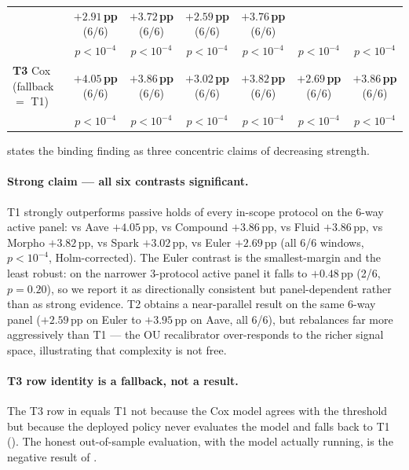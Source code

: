 \begin{table}[t]
\begin{tabular}{lcccccc}
      & \textbf{$+2.91$\,pp} (6/6)
      & \textbf{$+3.72$\,pp} (6/6)
      & \textbf{$+2.59$\,pp} (6/6)
      & \textbf{$+3.76$\,pp} (6/6) \\
      & $p < 10^{-4}$
      & $p < 10^{-4}$
      & $p < 10^{-4}$
      & $p < 10^{-4}$
      & $p < 10^{-4}$
      & $p < 10^{-4}$ \\
    \midrule
    \textbf{T3} Cox (fallback $=$ T1)
      & \textbf{$+4.05$\,pp} (6/6)
      & \textbf{$+3.86$\,pp} (6/6)
      & \textbf{$+3.02$\,pp} (6/6)
      & \textbf{$+3.82$\,pp} (6/6)
      & \textbf{$+2.69$\,pp} (6/6)
      & \textbf{$+3.86$\,pp} (6/6) \\
      & $p < 10^{-4}$
      & $p < 10^{-4}$
      & $p < 10^{-4}$
      & $p < 10^{-4}$
      & $p < 10^{-4}$
      & $p < 10^{-4}$ \\
    \bottomrule
  \end{tabular}
\end{table}

 states the binding finding as three concentric
claims of decreasing strength.

\paragraph{Strong claim — all six contrasts significant.} T1
strongly outperforms passive holds of every in-scope protocol on
the 6-way active panel: vs Aave $+4.05$\,pp, vs Compound
$+3.86$\,pp, vs Fluid $+3.86$\,pp, vs Morpho $+3.82$\,pp, vs Spark
$+3.02$\,pp, vs Euler $+2.69$\,pp (all 6/6 windows, $p < 10^{-4}$,
Holm-corrected). The Euler contrast is the smallest-margin and the
least robust: on the narrower 3-protocol active panel it falls to
$+0.48$\,pp (2/6, $p = 0.20$), so we report it as directionally
consistent but panel-dependent rather than as strong evidence. T2
obtains a near-parallel result on the same 6-way panel ($+2.59$\,pp
on Euler to $+3.95$\,pp on Aave, all 6/6), but rebalances far more
aggressively than T1 --- the OU recalibrator over-responds to the
richer signal space, illustrating that complexity is not free.

\paragraph{T3 row identity is a fallback, not a result.}
The T3 row in  equals T1 not because the Cox
model agrees with the threshold but because the deployed policy
never evaluates the model and falls back to T1
().  The honest out-of-sample evaluation, with
the model actually running, is the negative result of
.

